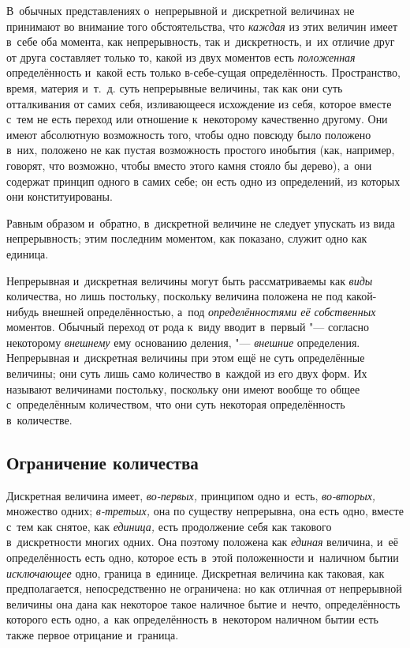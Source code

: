 
В~обычных представлениях о~непрерывной и~дискретной величинах не принимают во
внимание того обстоятельства, что {\em каждая} из этих величин имеет в~себе оба
момента, как непрерывность, так и~дискретность, и~их отличие друг от друга
составляет только то, какой из двух моментов есть {\em положенная}
определённость и~какой есть только в-себе-сущая определённость. Пространство,
время, материя и~т.~д. суть непрерывные величины, так как они суть отталкивания
от самих себя, изливающееся исхождение из себя, которое вместе с~тем не есть
переход или отношение к~некоторому качественно другому. Они имеют абсолютную
возможность того, чтобы одно повсюду было положено в~них, положено не как
пустая возможность простого инобытия (как, например, говорят, что возможно,
чтобы вместо этого камня стояло бы дерево), а~они содержат принцип одного в
самих себе; он есть одно из определений, из которых они конституированы.

Равным образом и~обратно, в~дискретной величине не следует упускать из вида
непрерывность; этим последним моментом, как показано, служит одно как единица.

Непрерывная и~дискретная величины могут быть рассматриваемы как {\em виды}
количества, но лишь постольку, поскольку величина положена не под какой-нибудь
внешней определённостью, а~под {\em определённостями её собственных} моментов.
Обычный переход от рода к~виду вводит в~первый "--- согласно некоторому
{\em внешнему} ему основанию деления, "--- {\em внешние} определения.
Непрерывная и~дискретная величины при этом ещё не суть определённые величины;
они суть лишь само количество в~каждой из его двух форм. Их называют величинами
постольку, поскольку они имеют вообще то общее с~определённым количеством, что
они суть некоторая определённость в~количестве.

\subsection{Ограничение количества}

Дискретная величина имеет, {\em во-первых,} принципом одно и~есть,
{\em во-вторых,} множество одних; {\em в-третьих,} она по существу непрерывна,
она есть одно, вместе с~тем как снятое, как {\em единица,} есть продолжение
себя как такового в~дискретности многих одних. Она поэтому положена как
{\em единая} величина, и~её определённость есть одно, которое есть в~этой
положенности и~наличном бытии {\em исключающее} одно, граница в~единице.
Дискретная величина как таковая, как предполагается, непосредственно не
ограничена: но как отличная от непрерывной величины она дана как некоторое
такое наличное бытие и~нечто, определённость которого есть одно, а~как
определённость в~некотором наличном бытии есть также первое
отрицание и~граница.

